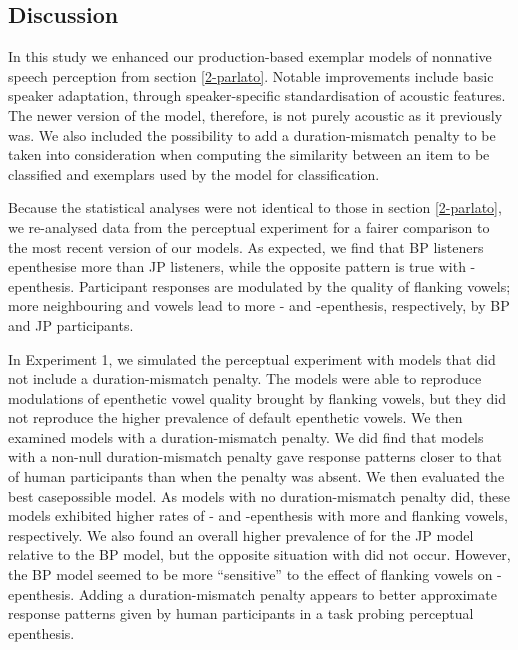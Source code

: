 \subsection{Discussion}

In this study we enhanced our production-based exemplar models of nonnative speech perception from section \ref{2-parlato}. Notable improvements include basic speaker adaptation, through speaker-specific standardisation of acoustic features. The newer version of the model, therefore, is not purely acoustic as it previously was. We also included the possibility to add a duration-mismatch penalty to be taken into consideration when computing the similarity between an item to be classified and exemplars used by the model for classification.

Because the statistical analyses were not identical to those in section \ref{2-parlato}, we re-analysed data from the perceptual experiment for a fairer comparison to the most recent version of our models. As expected, we find that BP listeners epenthesise more  than JP listeners, while the opposite pattern is true with -epenthesis. Participant responses are modulated by the quality of flanking vowels; more neighbouring  and  vowels lead to more - and -epenthesis, respectively, by BP and JP participants.

In Experiment 1, we simulated the perceptual experiment with models that did not include a duration-mismatch penalty. The models were able to reproduce modulations of epenthetic vowel quality brought by flanking vowels, but they did not reproduce the higher prevalence of default epenthetic vowels.
We then examined models with a duration-mismatch penalty. We did find that models with a non-null duration-mismatch penalty gave response patterns closer to that of human participants than when the penalty was absent. We then evaluated the best casepossible model. As models with no duration-mismatch penalty did, these models exhibited higher rates of - and -epenthesis with more  and  flanking vowels, respectively. We also found an overall higher prevalence of  for the JP model relative to the BP model, but the opposite situation with  did not occur. However, the BP model seemed to be more ``sensitive'' to the effect of  flanking vowels on -epenthesis. Adding a duration-mismatch penalty appears to better approximate response patterns given by human participants in a task probing perceptual epenthesis.  

